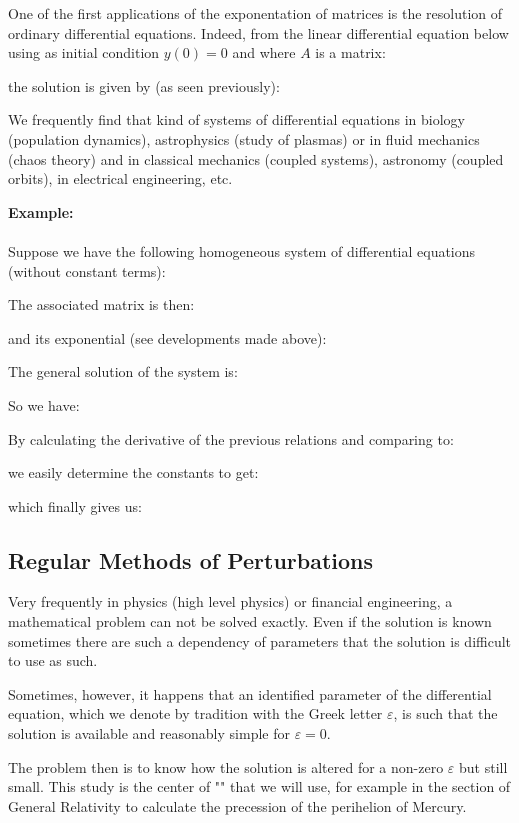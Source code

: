 	One of the first applications of the exponentation of matrices is the resolution of ordinary differential equations. Indeed, from the linear differential equation below using as initial condition $y(0)=0$ and where $A$ is a matrix:
	
	the solution is given by (as seen previously):
	
	We frequently find that kind of systems of differential equations in biology (population dynamics), astrophysics (study of plasmas) or in fluid mechanics (chaos theory) and in classical mechanics (coupled systems), astronomy (coupled orbits), in electrical engineering, etc.
	
	\begin{tcolorbox}[colframe=black,colback=white,sharp corners]
	\textbf{{\Large {}}Example:}\\\\
	Suppose we have the following homogeneous system of differential equations (without constant terms):
	
	The associated matrix is then:
	
	and its exponential (see developments made above):
	
	The general solution of the system is:
	
	So we have:
	
	By calculating the derivative of the previous relations and comparing to:
	
	we easily determine the constants to get:
	
	which finally gives us:
	
	\end{tcolorbox}

	\subsection{Regular Methods of Perturbations}\label{regular methods of perturbations}
	Very frequently in physics (high level physics) or financial engineering, a mathematical problem can not be solved exactly. Even if the solution is known sometimes there are such a dependency of parameters that the solution is difficult to use as such.
	
	Sometimes, however, it happens that an identified parameter of the differential equation, which we denote by tradition with the Greek letter $\varepsilon$, is such that the solution is available and reasonably simple for $\varepsilon=0$.
	
	The problem then is to know how the solution is altered for a non-zero $\varepsilon$ but still small. This study is the center of "" that we will use, for example in the section of General Relativity to calculate the precession of the perihelion of Mercury.
	
